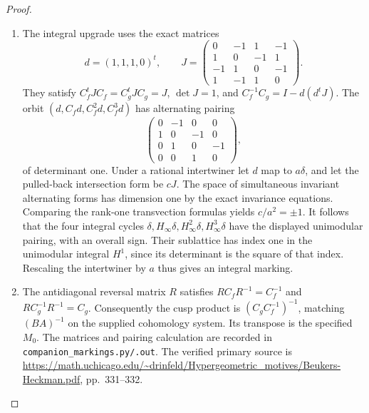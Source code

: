 \documentclass[11pt,a4paper]{article}
\theoremstyle{definition}
\begin{document}
\begin{proof}
\begin{enumerate}[label=\arabic*.]
\item The integral upgrade uses the exact matrices
\[
d=(1,1,1,0)^t,\qquad
J=\begin{pmatrix}
0&-1&1&-1\\1&0&-1&1\\-1&1&0&-1\\1&-1&1&0
\end{pmatrix}.
\]
They satisfy $C_f^tJC_f=C_g^tJC_g=J$, $\det J=1$, and
$C_f^{-1}C_g=I-d(d^tJ)$.
The orbit $(d,C_fd,C_f^2d,C_f^3d)$ has alternating pairing
\[
\begin{pmatrix}0&-1&0&0\\1&0&-1&0\\0&1&0&-1\\0&0&1&0\end{pmatrix},
\]
of determinant one.  Under a rational intertwiner let $d$ map to
$a\delta$, and let the pulled-back intersection form be $cJ$.
The space of simultaneous invariant alternating forms has dimension
one by the exact invariance equations.  Comparing the rank-one
transvection formulas yields $c/a^2=\pm1$.
It follows that the four integral cycles
$\delta,H_\infty\delta,H_\infty^2\delta,H_\infty^3\delta$ have the
displayed unimodular pairing, with an overall sign.  Their sublattice
has index one in the unimodular integral $H^1$, since its determinant
is the square of that index.  Rescaling the intertwiner by $a$ thus
gives an integral marking.

\item The antidiagonal reversal matrix $R$ satisfies
$RC_fR^{-1}=C_f^{-1}$ and $RC_g^{-1}R^{-1}=C_g$.
Consequently the cusp product is $(C_gC_f^{-1})^{-1}$, matching
$(BA)^{-1}$ on the supplied cohomology system.  Its transpose is the
specified $M_0$.  The matrices and pairing calculation are recorded in
\texttt{companion\_markings.py/.out}.  The verified primary source is
\url{https://math.uchicago.edu/~drinfeld/Hypergeometric_motives/Beukers-Heckman.pdf},
pp.~331--332.

\end{enumerate}
\end{proof}
\end{document}
